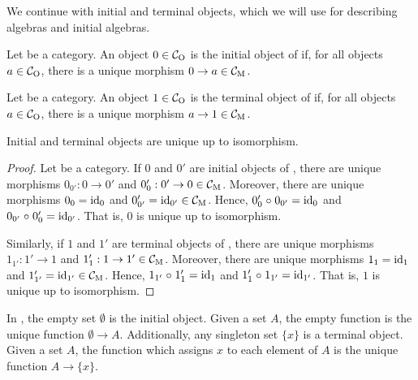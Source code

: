 We continue with initial and terminal objects, which we will use for
describing algebras and initial algebras.

\begin{definition}
  \label{def:initial-object}


  Let  be a category. An object $0 \in \mathcal{C}_{\operatorname{O}}$ is the initial
  object of  if, for all objects $a \in \mathcal{C}_{\operatorname{O}}$, there is a
  unique morphism $0 \to a \in \mathcal{C}_{\operatorname{M}}$.

\end{definition}

\begin{definition}
  \label{def:terminal-object}


  Let  be a category. An object $1 \in \mathcal{C}_{\operatorname{O}}$ is the
  terminal object of  if, for all objects $a \in \mathcal{C}_{\operatorname{O}}$,
  there is a unique morphism $a \to 1 \in \mathcal{C}_{\operatorname{M}}$.

\end{definition}

\begin{lemma}

  Initial and terminal objects are unique up to isomorphism.

  \begin{proof}

    Let  be a category. If $0$ and $0'$ are initial objects of
    , there are unique morphisms $0_{0'}: 0 \to 0'$ and
    $0'_{0}: 0' \to 0 \in \mathcal{C}_{\operatorname{M}}$. Moreover, there are unique
    morphisms $0_{0} = \operatorname{id}_{0}$ and $0'_{0'} = \operatorname{id}_{0'} \in \mathcal{C}_{\operatorname{M}}$.
    Hence, $0'_{0} \mathrel{\circ} 0_{0'} = \operatorname{id}_{0}$ and $0_{0'} \mathrel{\circ} 0'_{0} =
    \operatorname{id}_{0'}$. That is, $0$ is unique up to isomorphism.

    Similarly, if $1$ and $1'$ are terminal objects of , there
    are unique morphisms $1_{1'}: 1' \to 1$ and $1'_{1}: 1 \to 1' \in
    \mathcal{C}_{\operatorname{M}}$. Moreover, there are unique morphisms $1_{1} = \operatorname{id}_{1}$
    and $1'_{1'} = \operatorname{id}_{1'} \in \mathcal{C}_{\operatorname{M}}$. Hence, $1_{1'} \mathrel{\circ} 1'_{1}
    = \operatorname{id}_{1}$ and $1'_{1} \mathrel{\circ} 1_{1'} = \operatorname{id}_{1'}$. That is, $1$ is
    unique up to isomorphism.

  \end{proof}

\end{lemma}

\begin{example}
  \label{ex:initial-terminal-objects-set}


  In \set, the empty set $\emptyset$ is the initial object. Given a
  set $A$, the empty function is the unique function $\emptyset \to
  A$. Additionally, any singleton set $\{x\}$ is a terminal object.
  Given a set $A$, the function which assigns $x$ to each element of
  $A$ is the unique function $A \to \{x\}$.

\end{example}

